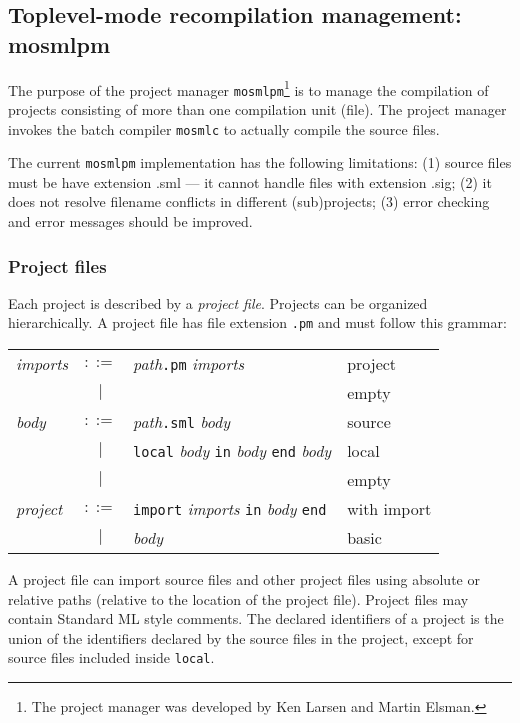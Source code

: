 \documentclass[fleqn,a4paper]{article}
\begin{document}
\subsection{Toplevel-mode recompilation management: mosmlpm}
\label{sec-project-manager}

The purpose of the project manager \texttt{mosmlpm}\footnote{The
  project manager was developed by Ken Larsen and Martin Elsman.}  is
to manage the compilation of projects consisting of more than one
compilation unit (file).  The project manager invokes the batch
compiler \texttt{mosmlc} to actually compile the source files.

The current \texttt{mosmlpm} implementation has the following
limitations: (1) source files must be have extension .sml --- it
cannot handle files with extension .sig; (2) it does not resolve
filename conflicts in different (sub)projects; (3) error checking and
error messages should be improved.


\subsubsection{Project files}
\label{sec:gramm-proj-files}

Each project is described by a \emph{project file}.  Projects can be
organized hierarchically.  A project file has file extension
\texttt{.pm} and must follow this grammar:

\begin{tabular}{lcll}

\textit{imports} &$::=$& \textit{path}\texttt{.pm} \textit{imports} & project\\
                 & $|$ &                                            & empty\\
\textit{body}    &$::=$& \textit{path}\texttt{.sml} \textit{body} & source\\
                 & $|$ & \texttt{local} \textit{body} \texttt{in}
                         \textit{body} \texttt{end} \textit{body} & local\\
                 & $|$ &                                          & empty\\
\textit{project} &$::=$& \texttt{import} \textit{imports} \texttt{in}
                         \textit{body} \texttt{end} & with import\\
                 & $|$ & \textit{body}              & basic
\end{tabular}

\noindent A project file can import source files and other project
files using absolute or relative paths (relative to the location of
the project file).  Project files may contain Standard ML style
comments.  The declared identifiers of a project is the union of the
identifiers declared by the source files in the project, except for
source files included inside \texttt{local}.
\end{document}
